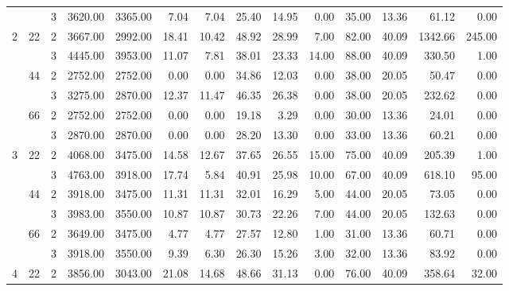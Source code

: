 \begin{tabular}{lllrrrrrrrrrrr}
  &    & 3 &  3620.00 &   3365.00 &  7.04 &    7.04 &   25.40 &   14.95 &    0.00 &   35.00 &   13.36 &   61.12 &     0.00 \\
\cline{1-14}
\cline{2-14}
\multirow{6}{*}{2} & \multirow{2}{*}{22} & 2 &  3667.00 &   2992.00 & 18.41 &   10.42 &   48.92 &   28.99 &    7.00 &   82.00 &   40.09 & 1342.66 &   245.00 \\
  &    & 3 &  4445.00 &   3953.00 & 11.07 &    7.81 &   38.01 &   23.33 &   14.00 &   88.00 &   40.09 &  330.50 &     1.00 \\
\cline{2-14}
  & \multirow{2}{*}{44} & 2 &  2752.00 &   2752.00 &  0.00 &    0.00 &   34.86 &   12.03 &    0.00 &   38.00 &   20.05 &   50.47 &     0.00 \\
  &    & 3 &  3275.00 &   2870.00 & 12.37 &   11.47 &   46.35 &   26.38 &    0.00 &   38.00 &   20.05 &  232.62 &     0.00 \\
\cline{2-14}
  & \multirow{2}{*}{66} & 2 &  2752.00 &   2752.00 &  0.00 &    0.00 &   19.18 &    3.29 &    0.00 &   30.00 &   13.36 &   24.01 &     0.00 \\
  &    & 3 &  2870.00 &   2870.00 &  0.00 &    0.00 &   28.20 &   13.30 &    0.00 &   33.00 &   13.36 &   60.21 &     0.00 \\
\cline{1-14}
\cline{2-14}
\multirow{6}{*}{3} & \multirow{2}{*}{22} & 2 &  4068.00 &   3475.00 & 14.58 &   12.67 &   37.65 &   26.55 &   15.00 &   75.00 &   40.09 &  205.39 &     1.00 \\
  &    & 3 &  4763.00 &   3918.00 & 17.74 &    5.84 &   40.91 &   25.98 &   10.00 &   67.00 &   40.09 &  618.10 &    95.00 \\
\cline{2-14}
  & \multirow{2}{*}{44} & 2 &  3918.00 &   3475.00 & 11.31 &   11.31 &   32.01 &   16.29 &    5.00 &   44.00 &   20.05 &   73.05 &     0.00 \\
  &    & 3 &  3983.00 &   3550.00 & 10.87 &   10.87 &   30.73 &   22.26 &    7.00 &   44.00 &   20.05 &  132.63 &     0.00 \\
\cline{2-14}
  & \multirow{2}{*}{66} & 2 &  3649.00 &   3475.00 &  4.77 &    4.77 &   27.57 &   12.80 &    1.00 &   31.00 &   13.36 &   60.71 &     0.00 \\
  &    & 3 &  3918.00 &   3550.00 &  9.39 &    6.30 &   26.30 &   15.26 &    3.00 &   32.00 &   13.36 &   83.92 &     0.00 \\
\cline{1-14}
\cline{2-14}
\multirow{6}{*}{4} & \multirow{2}{*}{22} & 2 &  3856.00 &   3043.00 & 21.08 &   14.68 &   48.66 &   31.13 &    0.00 &   76.00 &   40.09 &  358.64 &    32.00 \\

\end{tabular}
